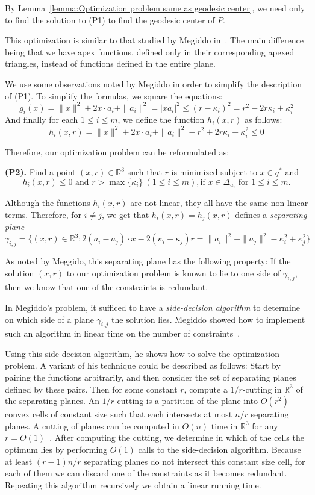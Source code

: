 \documentclass[a4paper,UKenglish]{lipics}
\begin{document}
By Lemma~\ref{lemma:Optimization problem same as geodesic center}, we need only to find the solution to (P1) to find the geodesic center of $P$.

This optimization is similar to that studied by Megiddo in~\cite{megiddo1989ball}. 
The main difference being that we have apex functions, defined only in their corresponding apexed triangles, instead of functions defined in the entire plane. 

We use some observations noted by Megiddo in order to simplify the description of (P1).
To simplify the formulas, we square the equations:
$$g_i(x) = \|x\|^2 + 2x\cdot a_i + \|a_i\|^2  = |x a_i|^2 \leq (r - \kappa_i)^2 = r^2 - 2r\kappa_i + \kappa_i^2$$ 
And finally for each $1\leq i\leq m$, we define the function $h_i(x, r)$ as follows:
$$h_i(x, r) = \|x\|^2 + 2x\cdot a_i + \|a_i\|^2  - r^2 + 2r\kappa_i - \kappa_i^2 \leq 0$$

Therefore, our optimization problem can be reformulated as:

\textbf{(P2).} Find a point $(x,r)\in \mathbb{R}^3$ such that $r$ is minimized subject to $x\in q^*$ and 
$$h_i(x, r) \leq 0 \text{ and } r > \max\{\kappa_i\}\ (1\leq i\leq m), \text{if $x\in \Delta_{a_i}$ for $1\leq i \leq m$}.$$

Although the functions $h_i(x,r)$ are not linear, they all have the same non-linear terms. Therefore, for $i\neq j$, we get that
$h_i(x,r) = h_j(x, r)$ defines a \emph{separating plane}
$$\gamma_{i,j} = \{(x, r) \in \mathbb{R}^3: 2 (a_i - a_j) \cdot x - 2( \kappa_i - \kappa_j) r = \|a_i\|^2 - \|a_j\|^2 - \kappa_i^2 + \kappa_j^2\}$$

As noted by Meggido, this separating plane has the following property:
If the solution $(x, r)$ to our optimization problem is known to lie to one side of $\gamma_{i,j}$, then we know that one of the constraints is redundant. 

In Megiddo's problem, it sufficed to have a \emph{side-decision algorithm} to determine on which side of a plane $\gamma_{i,j}$ the solution lies. Megiddo showed how to implement such an algorithm in linear time on the number of constraints~\cite{megiddo1989ball}.

Using this side-decision algorithm, he shows how to solve the optimization problem. A variant of his technique could be described as follows: Start by pairing the functions arbitrarily, and then consider the set of separating planes defined by these pairs.
Then for some constant $r$, compute a $1/r$-cutting in $\mathbb{R}^3$ of the separating planes.
An $1/r$-cutting is a partition of the plane into $O(r^2)$ convex cells of constant size such that each intersects at most $n/r$ separating planes.
A cutting of planes can be computed in $O(n)$ time in $\mathbb{R}^3$ for any $r = O(1)$~\cite{matousekCuttings}.
After computing the cutting, we determine in which of the cells the optimum lies by performing $O(1)$ calls to the side-decision algorithm. 
Because at least $(r-1)n/r$ separating planes do not intersect this constant size cell, for each of them we can discard one of the constraints as it becomes redundant. Repeating this algorithm recursively we obtain a linear running time.
\end{document}
